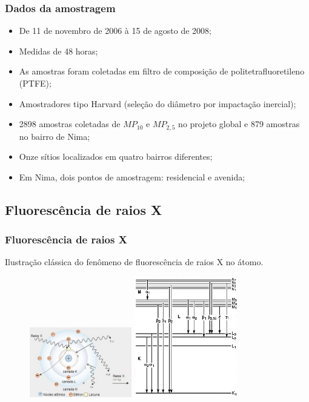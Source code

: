 \begin{frame}
	\frametitle{Dados da amostragem}
	\begin{itemize}
		\item De 11 de novembro de 2006 à 15 de agosto de 2008;
		\item Medidas de 48 horas;
		\item As amostras foram coletadas em filtro de composição de politetrafluoretileno
		(PTFE);
		\item Amostradores tipo Harvard (seleção do diâmetro por impactação inercial);
		\item 2898 amostras coletadas de $MP_{10}$ e $MP_{2,5}$ no projeto global e 879 amostras no bairro de Nima;
		\item Onze sítios localizados em quatro bairros diferentes;
		\item Em Nima, dois pontos de amostragem: residencial e avenida;
	\end{itemize}
\end{frame}

\subsection{Fluorescência de raios X}
\begin{frame}
  \frametitle{Fluorescência de raios X}
  Ilustração clássica do fenômeno de fluorescência de raios X no átomo.
  \begin{figure}[H]
    \centering
    \includegraphics[width=0.4\textwidth]{../../inputs/images/shimadzu_atomo.jpg}
    \hspace{1cm}
    \includegraphics[width=0.4\textwidth]{../../inputs/images/Siegbahn.jpg}
  \end{figure}
\end{frame}

